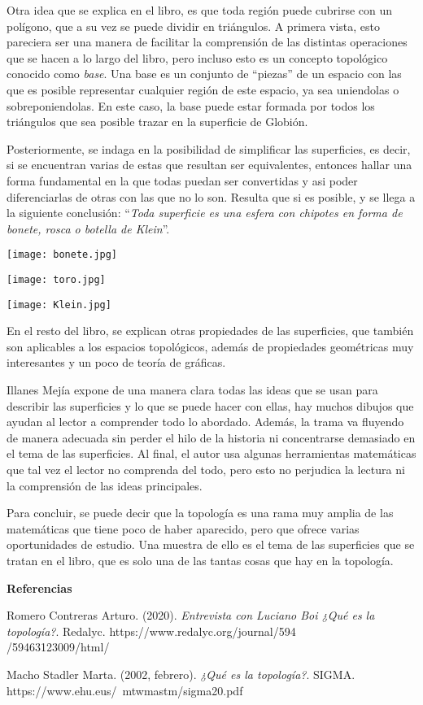 \documentclass[12pt]{article}
\begin{document}
\begin{multicols}{2}
		Otra idea que se explica en el libro, es que toda región puede cubrirse con un polígono, que a su vez se puede dividir en triángulos. A primera vista, esto pareciera ser una manera de facilitar la comprensión de las distintas operaciones que se hacen a lo largo del libro, pero incluso esto es un concepto topológico conocido como \textit{base}. Una base es un conjunto de ``piezas'' de un espacio con las que es posible representar cualquier región de este espacio, ya sea uniendolas o sobreponiendolas. En este caso, la base puede estar formada por todos los triángulos que sea posible trazar en la superficie de Globión.

		Posteriormente, se indaga en la posibilidad de simplificar las superficies, es decir, si se encuentran varias de estas que resultan ser equivalentes, entonces hallar una forma fundamental en la que todas puedan ser convertidas y asi poder diferenciarlas de otras con las que no lo son. Resulta que si es posible, y se llega a la siguiente conclusión: ``\textit{Toda superficie es una esfera con chipotes en forma de bonete, rosca o botella de Klein}''. 

		\begin{center}
			\texttt{[image: bonete.jpg]}

			\texttt{[image: toro.jpg]} 

			\texttt{[image: Klein.jpg]}
		\end{center}

		En el resto del libro, se explican otras propiedades de las superficies, que también son aplicables a los espacios topológicos, además de propiedades geométricas muy interesantes y un poco de teoría de gráficas.

		Illanes Mejía expone de una manera clara todas las ideas que se usan para describir las superficies y lo que se puede hacer con ellas, hay muchos dibujos que ayudan al lector a comprender todo lo abordado. Además, la trama va fluyendo de manera adecuada sin perder el hilo de la historia ni concentrarse demasiado en el tema de las superficies. Al final, el autor usa algunas herramientas matemáticas que tal vez el lector no comprenda del todo, pero esto no perjudica la lectura ni la comprensión de las ideas principales. 

		Para concluir, se puede decir que la topología es una rama muy amplia de las matemáticas que tiene poco de haber aparecido, pero que ofrece varias oportunidades de estudio. Una muestra de ello es el tema de las superficies que se tratan en el libro, que es solo una de las tantas cosas que hay en la topología. 

		\textbf{Referencias}

		Romero Contreras Arturo. (2020). \textit{Entrevista con Luciano Boi ¿Qué es la topología?}. Redalyc. https://www.redalyc.org/journal/594\\/59463123009/html/

		Macho Stadler Marta. (2002, febrero). \textit{¿Qué es la topología?}. SIGMA. https://www.ehu.eus/~mtwmastm/sigma20.pdf
	\end{multicols}
\end{document}
